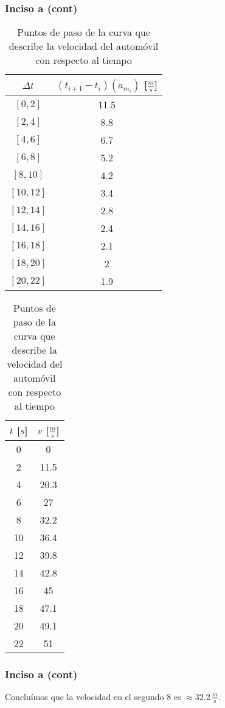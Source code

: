 \documentclass[11pt]{beamer}
\begin{document}
	\begin{frame}
		\frametitle{Inciso a (cont)}
		
		\begin{table}[H]
			\centering
			\begin{tabular}{|c|c|}
				\hline
				$\Delta t$ & $(t_{i+1} - t_{i})(a_{m_{i}})$ [$\frac{m}{s}$]\\
				\hline
				$[0,2]$&11.5\\
				\hline
				$[2,4]$&8.8\\
				\hline
				$[4,6]$&6.7\\
				\hline
				$[6,8]$&5.2\\
				\hline
				$[8,10]$&4.2\\
				\hline
				$[10,12]$&3.4\\
				\hline
				$[12,14]$&2.8\\
				\hline
				$[14,16]$&2.4\\
				\hline
				$[16,18]$&2.1\\
				\hline
				$[18,20]$&2\\
				\hline
				$[20,22]$&1.9\\
				\hline
			\end{tabular}
			\qquad
			\begin{tabular}{|c|c|}
				\hline
				$t$ [$s$] & $v$ [$\frac{m}{s}$]\\
				\hline
				0&0\\
				\hline
				2&11.5\\
				\hline
				4&20.3\\
				\hline
				6&27\\
				\hline
				\alert{8}&\alert{32.2}\\
				\hline
				10&36.4\\
				\hline
				12&39.8\\
				\hline
				14&42.8\\
				\hline
				16&45\\
				\hline
				18&47.1\\
				\hline
				20&49.1\\
				\hline
				22&51\\
				\hline
			\end{tabular}
			\caption{Puntos de paso de la curva que describe la velocidad del automóvil con respecto al tiempo}
			\label{tab:Velocidades2}
		\end{table}
	\end{frame}

	\begin{frame}
		\frametitle{Inciso a (cont)}
		
		Concluímos que la velocidad en el segundo 8 es $\approx 32.2 \, \frac{m}{s}$.
	\end{frame}
\end{document}
